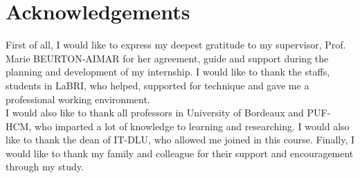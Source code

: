 \chapter*{Acknowledgements}
\thispagestyle{empty}
\indent First of all, I would like to express my deepest gratitude to my supervisor, Prof. Marie BEURTON-AIMAR for her agreement, guide and support during the planning and development of my internship. I would like to thank the staffs, students in LaBRI, who helped, supported for technique and gave me a professional working environment. 
\\[0.3cm]
I would also like to thank all professors in University of Bordeaux and PUF-HCM, who imparted a lot of knowledge to learning and researching. I would also like to thank the dean of IT-DLU, who allowed me joined in this course. 
Finally, I would like to thank my family and colleague for their support and encouragement through my study.
\clearpage